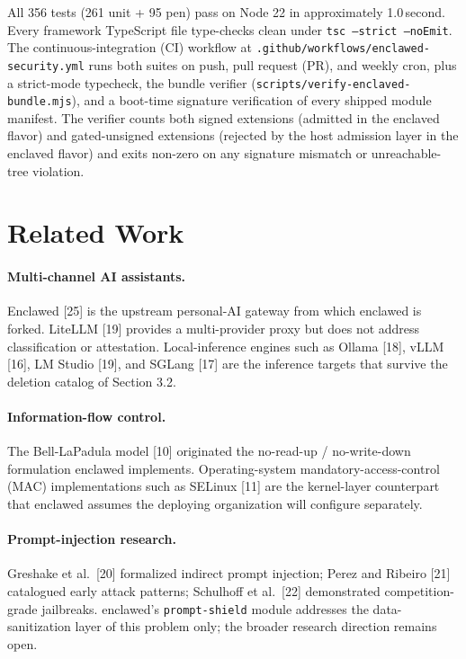 \documentclass[11pt]{article}
\begin{document}
All 356 tests (261 unit + 95 pen) pass on Node 22 in approximately
1.0\,second. Every framework TypeScript file type-checks clean under
\texttt{tsc --strict --noEmit}. The continuous-integration (CI)
workflow at
\texttt{.github/workflows/enclawed-security.yml} runs both suites on
push, pull request (PR), and weekly cron, plus a strict-mode typecheck,
the bundle verifier
(\texttt{scripts/verify-enclaved-bundle.mjs}), and a boot-time
signature verification of every shipped module manifest. The verifier
counts both signed extensions (admitted in the enclaved flavor) and
gated-unsigned extensions (rejected by the host admission layer in
the enclaved flavor) and exits non-zero on any signature mismatch or
unreachable-tree violation.

\section{Related Work}

\paragraph{Multi-channel AI assistants.} Enclawed [25] is the upstream
personal-AI gateway from which enclawed is forked. LiteLLM [19] provides
a multi-provider proxy but does not address classification or
attestation. Local-inference engines such as Ollama [18], vLLM [16],
LM Studio [19], and SGLang [17] are the inference targets that survive
the deletion catalog of Section 3.2.

\paragraph{Information-flow control.} The Bell-LaPadula model [10]
originated the no-read-up / no-write-down formulation enclawed
implements. Operating-system mandatory-access-control (MAC)
implementations such as SELinux [11] are the kernel-layer counterpart
that enclawed assumes the deploying organization will configure
separately.

\paragraph{Prompt-injection research.} Greshake et al.\ [20] formalized
indirect prompt injection; Perez and Ribeiro [21] catalogued early
attack patterns; Schulhoff et al.\ [22] demonstrated competition-grade
jailbreaks. enclawed's \texttt{prompt-shield} module addresses the
data-sanitization layer of this problem only; the broader research
direction remains open.
\end{document}
